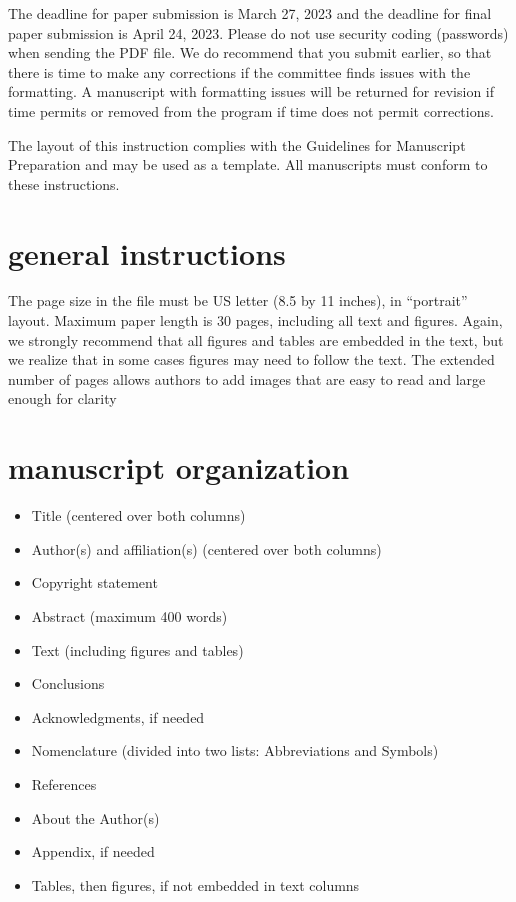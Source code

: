 \documentclass[10pt,twocolumn,twoside]{article}
\begin{document}
The deadline for paper submission is March 27, 2023 and the deadline for final
paper submission is April 24, 2023. Please do not use security coding (passwords) when sending the PDF file. We do recommend that you submit earlier, so that there is time to make any corrections if the committee finds issues with the formatting. A manuscript with formatting issues will be returned for revision if time permits or removed from the program if time does not permit corrections.

The layout of this instruction complies with the Guidelines for Manuscript Preparation and may be used as a template. All manuscripts must conform to these instructions.

\section{general instructions}
The page size in the file must be US letter (8.5 by 11 inches), in “portrait” layout. Maximum paper length is 30 pages, including all text and figures. Again, we strongly recommend that all figures and tables are embedded in the text, but we realize that in some cases figures may need to follow the text. The extended number of pages allows authors to add images that are easy to read and large enough for clarity

\section{manuscript organization}
\begin{itemize}
    \item Title (centered over both columns)
    \item Author(s) and affiliation(s) (centered over both columns)
    \item Copyright statement
    \item Abstract (maximum 400 words)
    \item Text (including figures and tables)
    \item Conclusions
    \item Acknowledgments, if needed
    \item Nomenclature (divided into two lists: Abbreviations and Symbols)
    \item References
    \item About the Author(s)
    \item Appendix, if needed
    \item Tables, then figures, if not embedded in text columns
\end{itemize}
\end{document}
